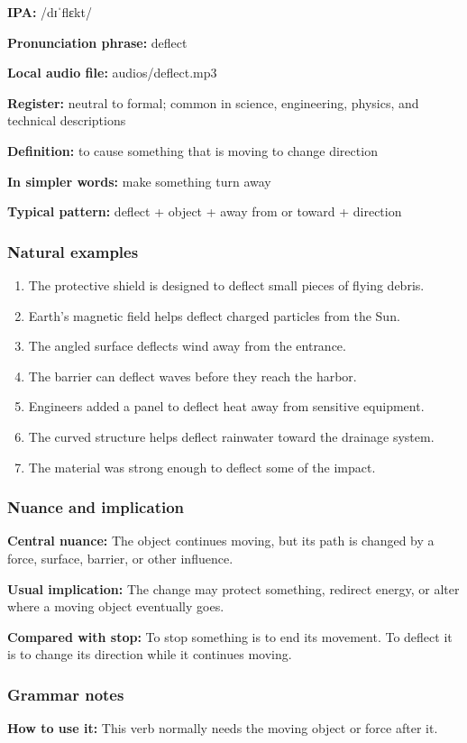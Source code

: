 \documentclass[11pt]{article}
\begin{document}
\textbf{IPA:} /dɪˈflɛkt/

\textbf{Pronunciation phrase:} deflect

\textbf{Local audio file:} audios/deflect.mp3

\textbf{Register:} neutral to formal; common in science, engineering, physics, and technical descriptions

\textbf{Definition:} to cause something that is moving to change direction

\textbf{In simpler words:} make something turn away

\textbf{Typical pattern:} deflect + object + away from or toward + direction

\subsubsection{Natural examples}
\begin{enumerate}
  \item The protective shield is designed to deflect small pieces of flying debris.
  \item Earth's magnetic field helps deflect charged particles from the Sun.
  \item The angled surface deflects wind away from the entrance.
  \item The barrier can deflect waves before they reach the harbor.
  \item Engineers added a panel to deflect heat away from sensitive equipment.
  \item The curved structure helps deflect rainwater toward the drainage system.
  \item The material was strong enough to deflect some of the impact.
\end{enumerate}

\subsubsection{Nuance and implication}
\textbf{Central nuance:} The object continues moving, but its path is changed by a force, surface, barrier, or other influence.

\textbf{Usual implication:} The change may protect something, redirect energy, or alter where a moving object eventually goes.

\textbf{Compared with stop:} To stop something is to end its movement. To deflect it is to change its direction while it continues moving.

\subsubsection{Grammar notes}
\textbf{How to use it:} This verb normally needs the moving object or force after it.
\end{document}
